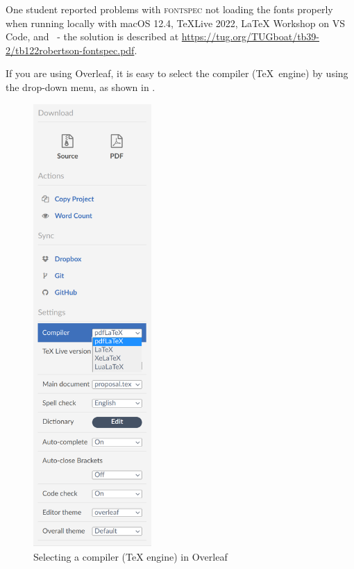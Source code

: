 \documentclass[main.tex]{subfiles}
\begin{document}
One student reported problems with \textsc{fontspec} not loading the fonts properly when running locally with macOS 12.4, TeXLive 2022, LaTeX Workshop on VS Code, and \XeLaTeX\  - the solution is described at \url{https://tug.org/TUGboat/tb39-2/tb122robertson-fontspec.pdf}.

If you are using Overleaf, it is easy to select the compiler (\ie \TeX\ engine) by using the drop-down menu, as shown in .
\begin{figure}[!ht]
  \begin{center}
    \includegraphics[width=0.40\textwidth]{README_notes/selecting-engine-in-overleaf.png}
  \end{center}
  \caption{Selecting a compiler (\ie TeX engine) in Overleaf}
  \label{fig:selectingTeXEngine}
\end{figure}
\FloatBarrier
\end{document}
